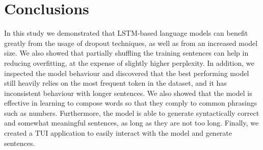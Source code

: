 \section{Conclusions}
In this study we demonstrated that LSTM-based language models can benefit greatly from the usage of dropout techniques, as well as from an increased model size. We also showed that partially shuffling the training sentences can help in reducing overfitting, at the expense of slightly higher perplexity. In addition, we inspected the model behaviour and discovered that the best performing model still heavily relies on the most frequent token in the dataset, and it has inconsistent behaviour with longer sentences. We also showed that the model is effective in learning to compose words so that they comply to common phrasings such as numbers. Furthermore, the model is able to generate syntactically correct and somewhat meaningful sentences, as long as they are not too long. Finally, we created a TUI application to easily interact with the model and generate sentences.